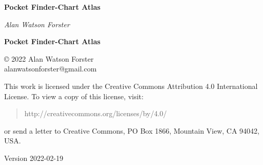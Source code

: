 
\pagestyle{empty}


\begin{center}
\vspace*{1cm}

\begingroup
\Huge\bfseries Pocket Finder-Chart Atlas
\endgroup

\vspace{1cm}

\vspace{1cm}

\begingroup
\large\itshape Alan Watson Forster
\endgroup

\end{center}


\cleardoublepage


\setcounter{page}{1}

\null\vfill

\begin{center}

\begingroup
\huge\bfseries Pocket Finder-Chart Atlas
\endgroup

\end{center}

\vfill

\clearpage


\null\vfill

\begin{raggedright}
\small

© 2022 Alan Watson Forster\\
alanwatsonforster@gmail.com

\medskip

This work is licensed under the Creative Commons Attribution 4.0 International License. To view a copy of this license, visit:
\begin{quote}
 http://creativecommons.org/licenses/by/4.0/ 
\end{quote}
or send a letter to Creative Commons, PO Box 1866, Mountain View, CA 94042, USA.

\medskip

Version 2022-02-19

\end{raggedright}

\cleardoublepage


\pagestyle{plain}

\tableofcontents
